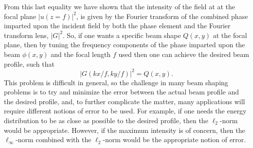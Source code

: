 From this last equality we have shown that the intensity of the field at at the focal plane $\rvert u(z=f)\rvert^2$, is given by the Fourier transform of the combined phase imparted upon the incident field by both the phase element and the Fourier transform lens, $\rvert G\rvert^2$. So, if one wants a specific beam shape $Q(x,y)$ at the focal plane, then by tuning the frequency components of the phase imparted upon the beam $\phi(x,y)$ and the focal length $f$ used then one can achieve the desired beam profile, such that
\begin{equation}
\label{eqn:beam_shaping_equality}
	\rvert G(kx/f,ky/f)\rvert^2=Q(x,y).
\end{equation}
This problem is difficult in general, so the challenge in many beam shaping problems is to try and minimize the error between the actual beam profile and the desired profile, and, to further complicate the matter, many applications will require different notions of error to be used.  For example, if one needs the energy distribution to be as close as possible to the desired profile, then the $\ell_2$-norm would be appropriate.  However, if the maximum intensity is of concern, then the $\ell_\infty$-norm combined with the $\ell_2$-norm would be the appropriate notion of error.


